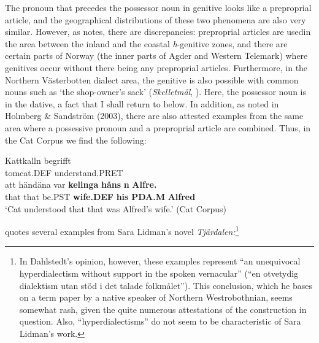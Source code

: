 
The pronoun that precedes the possessor noun in genitive looks like a preproprial article, and the geographical distributions of these two phenomena are also very similar. However, as \citet[67]{Delsing2003b} notes, there are discrepancies: preproprial articles are used\textstyleLinguisticExample{ }in the area between the inland and the coastal \textit{h}{}-genitive zones, and there are certain parts of Norway (the inner parts of Agder and Western Telemark) where genitives occur without there being any preproprial articles. Furthermore, in the Northern Västerbotten dialect area, the genitive is also possible with common nouns such as  ‘the shop-owner’s sack’ (\textit{Skelletmål}, \citet[23]{Marklund1976}). Here, the possessor noun is in the dative, a fact that I shall return to below. In addition, as noted in Holmberg \& Sandström (2003), there are also attested examples from the same area where a possessive pronoun and a preproprial article are combined. Thus, in the Cat Corpus we find the following:


\ea\label{}
\gll Kattkalln  begrifft\\
tomcat.DEF  understand.PRET\\
\gll att  händäna  var  \textbf{kelinga} \textbf{håns} \textbf{n} \textbf{Alfre.}\\
that  that  be.PST  \textbf{wife.DEF} \textbf{his} \textbf{PDA.M} \textbf{Alfred}\\
\glt  ‘Cat understood that that was Alfred’s wife.’ (Cat Corpus)
\z

\citet[51]{Dahlstedt1971} quotes several examples from Sara Lidman’s novel \textit{Tjärdalen}\textit{:}\footnote{ In Dahlstedt’s opinion, however, these examples represent “an unequivocal hyperdialectism without support in the spoken vernacular” (“en otvetydig dialektism utan stöd i det talade folkmålet”). This conclusion, which he bases on a term paper by a native speaker of Northern Westrobothnian, seems somewhat rash, given the quite numerous attestations of the construction in question. Also, “hyperdialectisms” do not seem to be characteristic of Sara Lidman’s work.\par }

